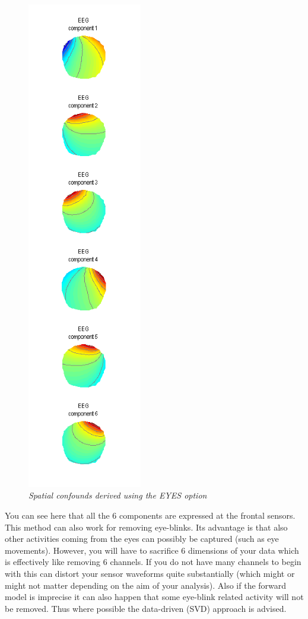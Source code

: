\begin{figure}
\begin{center}
\includegraphics[width=50mm]{meeg_artefact/figure4}
\caption{\em Spatial confounds derived using the EYES option\label{artefact_fig4}}
\end{center}
\end{figure}

You can see here that all the 6 components are expressed at the frontal sensors. This method can also work for removing eye-blinks. Its advantage is that also other activities coming from the eyes can possibly be captured (such as eye movements). However, you will have to sacrifice 6 dimensions of your data which is effectively like removing 6 channels. If you do not have many channels to begin with this can distort your sensor waveforms quite substantially (which might or might not matter depending on the aim of your analysis). Also if the forward model is imprecise it can also happen that some eye-blink related activity will not be removed. Thus where possible the data-driven (SVD) approach is advised.

